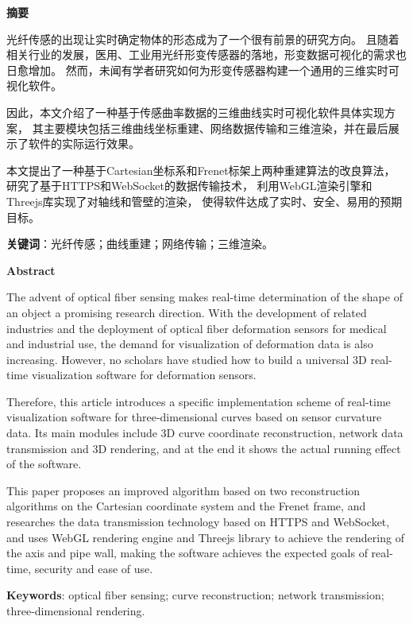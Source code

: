 \clearpage
\begin{center}
    \bfseries {} 摘要
\end{center}

光纤传感的出现让实时确定物体的形态成为了一个很有前景的研究方向。
且随着相关行业的发展，医用、工业用光纤形变传感器的落地，形变数据可视化的需求也日愈增加。
然而，未闻有学者研究如何为形变传感器构建一个通用的三维实时可视化软件。

因此，本文介绍了一种基于传感曲率数据的三维曲线实时可视化软件具体实现方案，
其主要模块包括三维曲线坐标重建、网络数据传输和三维渲染，并在最后展示了软件的实际运行效果。

本文提出了一种基于Cartesian坐标系和Frenet标架上两种重建算法的改良算法，
研究了基于HTTPS和WebSocket的数据传输技术，
利用WebGL渲染引擎和Threejs库实现了对轴线和管壁的渲染，
使得软件达成了实时、安全、易用的预期目标。

\textbf{关键词}：光纤传感；曲线重建；网络传输；三维渲染。

\clearpage

\begin{center}
    \bfseries {} Abstract
\end{center}

The advent of optical fiber sensing makes real-time determination of the shape of an object a promising research direction.
With the development of related industries and the deployment of optical fiber deformation sensors for medical and industrial use, the demand for visualization of deformation data is also increasing.
However, no scholars have studied how to build a universal 3D real-time visualization software for deformation sensors.

Therefore, this article introduces a specific implementation scheme of real-time visualization software for three-dimensional curves based on sensor curvature data.
Its main modules include 3D curve coordinate reconstruction, network data transmission and 3D rendering, and at the end it shows the actual running effect of the software.

This paper proposes an improved algorithm based on two reconstruction algorithms on the Cartesian coordinate system and the Frenet frame,
and researches the data transmission technology based on HTTPS and WebSocket,
and uses WebGL rendering engine and Threejs library to achieve the rendering of the axis and pipe wall,
making the software achieves the expected goals of real-time, security and ease of use.

\textbf{Keywords}: optical fiber sensing; curve reconstruction; network transmission; three-dimensional rendering.